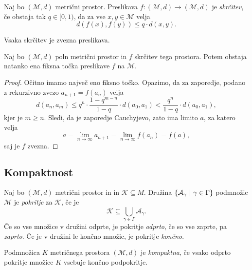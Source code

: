 \documentclass[12pt, a4paper]{article}
\begin{document}
\begin{definicija}
Naj bo $(\mathcal{M},d)$ metrični prostor. Preslikava $f\colon(\mathcal{M},d)\to(\mathcal{M},d)$ je \emph{skrčitev}, če obstaja tak $q\in[0,1)$, da za vse $x,y\in \mathcal{M}$ velja
\[
d(f(x),f(y))\leq q\cdot d(x,y).
\]
\end{definicija}

\begin{opomba}
Vsaka skrčitev je zvezna preslikava.
\end{opomba}

\begin{izrek}[Banach]
Naj bo $(\mathcal{M},d)$ poln metrični prostor in $f$ skrčitev tega prostora. Potem obstaja natanko ena fiksna točka preslikave $f$ na $\mathcal{M}$.
\end{izrek}

\begin{proof}
Očitno imamo največ eno fiksno točko. Opazimo, da za zaporedje, podano z rekurzivno zvezo $a_{n+1}=f(a_n)$ velja
\[
d(a_n,a_m)\leq q^n\cdot\frac{1-q^{m-n}}{1-q}\cdot d(a_0,a_1)<\frac{q^n}{1-q}\cdot d(a_0,a_1),
\]
kjer je $m\geq n$. Sledi, da je zaporedje Cauchyjevo, zato ima limito $a$, za katero velja
\[
a=\lim_{n\to\infty}a_{n+1}=\lim_{n\to\infty}f(a_n)=f(a),
\]
saj je $f$ zvezna.
\end{proof}

\newpage

\subsection{Kompaktnost}

\begin{definicija}
Naj bo $(\mathcal{M},d)$ metrični prostor in in $\mathcal{K}\subseteq M$. Družina $\left\{\mathcal{A}_\gamma~\middle\vert~\gamma\in\Gamma\right\}$ podmnožic $\mathcal{M}$ je \emph{pokritje} za $\mathcal{K}$, če je
\[
\mathcal{K}\subseteq\bigcup_{\gamma\in\Gamma}\mathcal{A}_\gamma.
\]
Če so vse množice v družini odprte, je pokritje \emph{odprto}, če so vse zaprte, pa \emph{zaprto}. Če je v družini le končno množic, je pokritje \emph{končno}.
\end{definicija}

\begin{okvir}
\begin{definicija}
Podmnožica $K$ metričnega prostora $(\mathcal{M},d)$ je \emph{kompaktna}, če vsako odprto pokritje množice $K$ vsebuje končno podpokritje.
\end{definicija}
\end{okvir}
\end{document}
